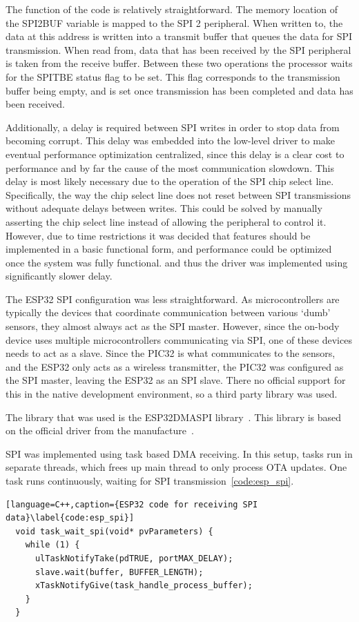 The function of the code is relatively straightforward.
The memory location of the SPI2BUF variable is mapped to the SPI 2 peripheral.
When written to, the data at this address is written into a transmit buffer that queues the data for SPI transmission.
When read from, data that has been received by the SPI peripheral is taken from the receive buffer.
Between these two operations the processor waits for the SPITBE status flag to be set.
This flag corresponds to the transmission buffer being empty, and is set once transmission has been completed and data has been received.

Additionally, a delay is required between SPI writes in order to stop data from becoming corrupt.
This delay was embedded into the low-level driver to make eventual performance optimization centralized,
since this delay is a clear cost to performance and by far the cause of the most communication slowdown.
This delay is most likely necessary due to the operation of the SPI chip select line.
Specifically, the way the chip select line does not reset between SPI transmissions without adequate delays between writes.
This could be solved by manually asserting the chip select line instead of allowing the peripheral to control it.
However, due to time restrictions it was decided that features should be implemented in a basic functional form,
and performance could be optimized once the system was fully functional.
and thus the driver was implemented using significantly slower delay.

The ESP32 SPI configuration was less straightforward.
As microcontrollers are typically the devices that coordinate communication between various `dumb' sensors,
they almost always act as the SPI master.
However, since the on-body device uses multiple microcontrollers communicating via SPI,
one of these devices needs to act as a slave.
Since the PIC32 is what communicates to the sensors, and the ESP32 only acts as a wireless transmitter,
the PIC32 was configured as the SPI master, leaving the ESP32 as an SPI slave.
There no official support for this in the native development environment, so a third party library was used.

The library that was used is the ESP32DMASPI library~\cite{ESP32DMASPI}.
This library is based on the official driver from the manufacture~\cite{SPI}.

SPI was implemented using task based DMA receiving.
In this setup, tasks run in separate threads, which frees up main thread to only process OTA updates.
One task runs continuously, waiting for SPI transmission~\autoref{code:esp_spi}.
%
\begin{lstlisting}[language=C++,caption={ESP32 code for receiving SPI data}\label{code:esp_spi}]
  void task_wait_spi(void* pvParameters) {
    while (1) {
      ulTaskNotifyTake(pdTRUE, portMAX_DELAY);
      slave.wait(buffer, BUFFER_LENGTH);
      xTaskNotifyGive(task_handle_process_buffer);
    }
  }
\end{lstlisting}

